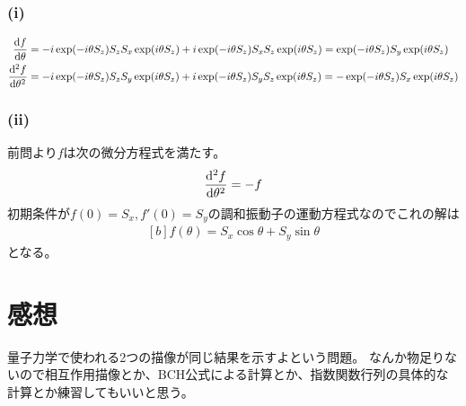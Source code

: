 \documentclass[../ap_2010.tex]{subfiles}
\begin{document}
\subsection{}
\subsubsection*{(i)}
\begin{equation}\begin{aligned}[b]
    \dv{f}{\theta}
    &=-i\exp(-i\theta S_z)S_zS_x\exp(i\theta S_z)+i\exp(-i\theta S_z)S_xS_z\exp(i\theta S_z)
    =\exp(-i\theta S_z)S_y\exp(i\theta S_z)\\
    \dv[2]{f}{\theta}
    &=-i\exp(-i\theta S_z)S_zS_y\exp(i\theta S_z)+i\exp(-i\theta S_z)S_yS_z\exp(i\theta S_z)
    =-\exp(-i\theta S_z)S_x\exp(i\theta S_z)
\end{aligned}\end{equation}
\subsubsection*{(ii)}
前問より\(f\)は次の微分方程式を満たす。
\begin{equation}\begin{aligned}[b]
    \dv[2]{f}{\theta}=-f
\end{aligned}\end{equation}
初期条件が\(f(0)=S_x,f'(0)=S_y\)の調和振動子の運動方程式なのでこれの解は
\begin{equation}\begin{aligned}[b]
    f(\theta)=S_x\cos\theta+S_y\sin\theta
\end{aligned}\end{equation}
となる。

\section*{感想}
量子力学で使われる2つの描像が同じ結果を示すよという問題。
なんか物足りないので相互作用描像とか、BCH公式による計算とか、指数関数行列の具体的な計算とか練習してもいいと思う。
\end{document}
